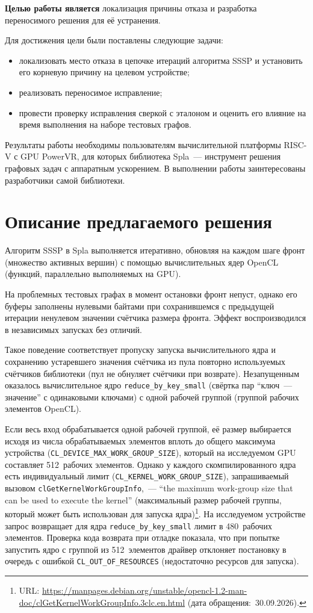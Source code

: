 \documentclass[a4paper]{article}
\begin{document}
\textbf{Целью работы является} локализация причины отказа и разработка переносимого решения для её устранения.

Для достижения цели были поставлены следующие задачи:
\begin{itemize}
    \item локализовать место отказа в цепочке итераций алгоритма SSSP и установить его корневую причину на целевом устройстве;
    \item реализовать переносимое исправление;
    \item провести проверку исправления сверкой с эталоном и оценить его влияние на время выполнения на наборе тестовых графов.
\end{itemize}

Результаты работы необходимы пользователям вычислительной платформы RISC-V с GPU PowerVR, для которых библиотека Spla~--- инструмент решения графовых задач с аппаратным ускорением. В выполнении работы заинтересованы разработчики самой библиотеки.

\section{Описание предлагаемого решения}

Алгоритм SSSP в Spla выполняется итеративно, обновляя на каждом шаге фронт (множество активных вершин) с помощью вычислительных ядер OpenCL (функций, параллельно выполняемых на GPU).

На проблемных тестовых графах в момент остановки фронт непуст, однако его буферы заполнены нулевыми байтами при сохранившемся с предыдущей итерации ненулевом значении счётчика размера фронта. Эффект воспроизводился в независимых запусках без отличий.

Такое поведение соответствует пропуску запуска вычислительного ядра и сохранению устаревшего значения счётчика из пула повторно используемых счётчиков библиотеки (пул не обнуляет счётчики при возврате). Незапущенным оказалось вычислительное ядро \texttt{reduce\_by\_key\_small} (свёртка пар \enquote{ключ~--- значение} с одинаковыми ключами) с одной рабочей группой (группой рабочих элементов OpenCL).

Если весь вход обрабатывается одной рабочей группой, её размер выбирается исходя из числа обрабатываемых элементов вплоть до общего максимума устройства (\texttt{CL\_DEVICE\_MAX\_WORK\_GROUP\_SIZE}), который на исследуемом GPU составляет 512~рабочих элементов. Однако у каждого скомпилированного ядра есть индивидуальный лимит (\texttt{CL\_KERNEL\_WORK\_GROUP\_SIZE}), запрашиваемый вызовом \texttt{clGetKernelWorkGroupInfo},~--- \foreignquote{english}{the maximum work-group size that can be used to execute the kernel} (максимальный размер рабочей группы, который может быть использован для запуска ядра)\footnote{URL: \url{https://manpages.debian.org/unstable/opencl-1.2-man-doc/clGetKernelWorkGroupInfo.3clc.en.html} (дата обращения:~30.09.2026).}. На исследуемом устройстве запрос возвращает для ядра \texttt{reduce\_by\_key\_small} лимит в 480~рабочих элементов. Проверка кода возврата при отладке показала, что при попытке запустить ядро с группой из 512~элементов драйвер отклоняет постановку в очередь с ошибкой \texttt{CL\_OUT\_OF\_RESOURCES} (недостаточно ресурсов для запуска).
\end{document}
